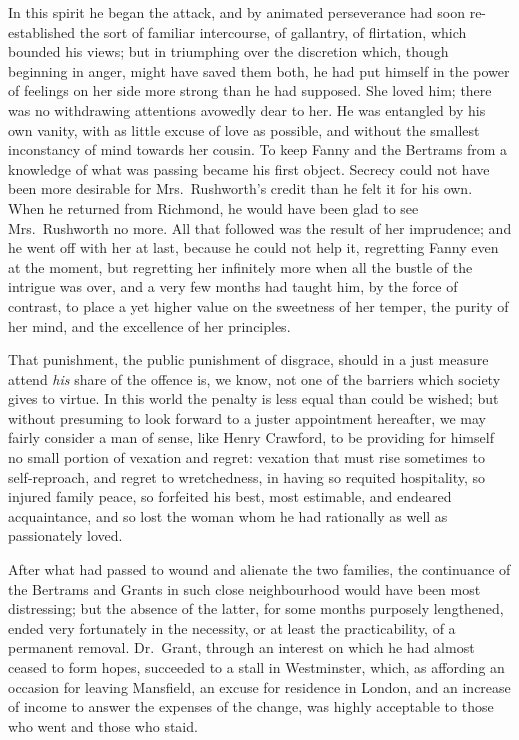 \documentclass{article}
\begin{document}
In this spirit he began the attack, and by animated
perseverance had soon re-established the sort of familiar
intercourse, of gallantry, of flirtation, which bounded
his views; but in triumphing over the discretion which,
though beginning in anger, might have saved them both,
he had put himself in the power of feelings on her side
more strong than he had supposed.  She loved him;
there was no withdrawing attentions avowedly dear to her.
He was entangled by his own vanity, with as little
excuse of love as possible, and without the smallest
inconstancy of mind towards her cousin.  To keep Fanny
and the Bertrams from a knowledge of what was passing
became his first object.  Secrecy could not have been
more desirable for Mrs.\ Rushworth's credit than he
felt it for his own.  When he returned from Richmond,
he would have been glad to see Mrs.\ Rushworth no more.
All that followed was the result of her imprudence;
and he went off with her at last, because he could
not help it, regretting Fanny even at the moment,
but regretting her infinitely more when all the bustle of
the intrigue was over, and a very few months had taught him,
by the force of contrast, to place a yet higher value
on the sweetness of her temper, the purity of her mind,
and the excellence of her principles.

That punishment, the public punishment of disgrace,
should in a just measure attend \emph{his} share of the offence is,
we know, not one of the barriers which society gives
to virtue.  In this world the penalty is less equal than
could be wished; but without presuming to look forward
to a juster appointment hereafter, we may fairly consider
a man of sense, like Henry Crawford, to be providing
for himself no small portion of vexation and regret:
vexation that must rise sometimes to self-reproach, and
regret to wretchedness, in having so requited hospitality,
so injured family peace, so forfeited his best, most estimable,
and endeared acquaintance, and so lost the woman whom
he had rationally as well as passionately loved.

After what had passed to wound and alienate the two families,
the continuance of the Bertrams and Grants in such
close neighbourhood would have been most distressing;
but the absence of the latter, for some months purposely
lengthened, ended very fortunately in the necessity,
or at least the practicability, of a permanent removal.
Dr.\ Grant, through an interest on which he had almost
ceased to form hopes, succeeded to a stall in Westminster,
which, as affording an occasion for leaving Mansfield,
an excuse for residence in London, and an increase of
income to answer the expenses of the change, was highly
acceptable to those who went and those who staid.
\end{document}
